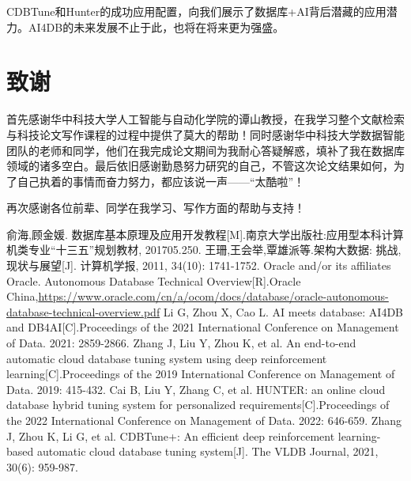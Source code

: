 \documentclass[a4paper,12pt]{article}
\begin{document}
CDBTune和Hunter的成功应用配置，向我们展示了数据库+AI背后潜藏的应用潜力。AI4DB的未来发展不止于此，也将在将来更为强盛。
\section{致谢}
首先感谢华中科技大学人工智能与自动化学院的谭山教授，在我学习整个文献检索与科技论文写作课程的过程中提供了莫大的帮助！同时感谢华中科技大学数据智能团队的老师和同学，他们在我完成论文期间为我耐心答疑解惑，填补了我在数据库领域的诸多空白。最后依旧感谢勤恳努力研究的自己，不管这次论文结果如何，为了自己执着的事情而奋力努力，都应该说一声——“太酷啦”！

再次感谢各位前辈、同学在我学习、写作方面的帮助与支持！



\begin{thebibliography}{99}
俞海,顾金媛. 数据库基本原理及应用开发教程[M].南京大学出版社:应用型本科计算机类专业“十三五”规划教材, 201705.250.
王珊,王会举,覃雄派等.架构大数据: 挑战, 现状与展望[J]. 计算机学报, 2011, 34(10): 1741-1752.
Oracle and/or its affiliates Oracle. Autonomous Database Technical Overview[R].Oracle China,{\url{https://www.oracle.com/cn/a/ocom/docs/database/oracle-autonomous-database-technical-overview.pdf}}
Li G, Zhou X, Cao L. AI meets database: AI4DB and DB4AI[C].Proceedings of the 2021 International Conference on Management of Data. 2021: 2859-2866.
Zhang J, Liu Y, Zhou K, et al. An end-to-end automatic cloud database tuning system using deep reinforcement learning[C].Proceedings of the 2019 International Conference on Management of Data. 2019: 415-432.
Cai B, Liu Y, Zhang C, et al. HUNTER: an online cloud database hybrid tuning system for personalized requirements[C].Proceedings of the 2022 International Conference on Management of Data. 2022: 646-659.
Zhang J, Zhou K, Li G, et al. CDBTune+: An efficient deep reinforcement learning-based automatic cloud database tuning system[J]. The VLDB Journal, 2021, 30(6): 959-987.

\end{thebibliography}
\end{document}
